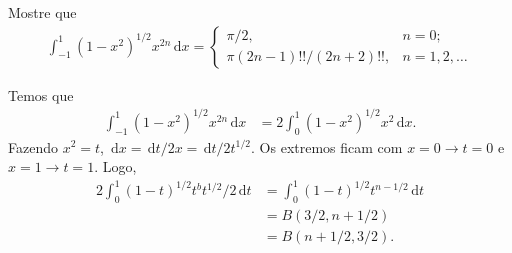 \documentclass[a4paper,12pt, leqno, answers]{exam}
\begin{document}
\begin{questions}

    \question[P2 de 2006] Mostre que
    \begin{align*}
        \int_{-1}^1 \left( 1 - x^2 \right)^{1/2} x^{2n} \,\mathrm{d}x = \begin{cases}
            \pi / 2, & n = 0; \\
            \pi \left( 2n - 1 \right)!! / \left( 2n + 2 \right)!!, & n = 1, 2, \ldots
        \end{cases}
    \end{align*}
    \begin{solution}
        Temos que
        \begin{align*}
            \int_{-1}^1 (1 - x^2)^{1/2} x^{2n} \,\mathrm{d}x &= 2 \int_0^1 (1 - x^2)^{1/2} x^2 \,\mathrm{d}x.
        \end{align*}
        Fazendo $x^2 = t$, $\,\mathrm{d}x = \,\mathrm{d}t/2x = \,\mathrm{d}t/2t^{1/2}$. Os extremos ficam com $x = 0 \to t = 0$ e $x = 1 \to t  = 1$. Logo,
        \begin{align*}
            2 \int_0^1 (1 - t)^{1/2} t^b t^{1/2} /2 \,\mathrm{d}t &= \int_0^1 (1 - t)^{1/2} t^{n - 1/2} \,\mathrm{d}t \\
            &= B(3/2, n + 1/2) \\
            &= B(n + 1/2, 3/2).
        \end{align*}
    \end{solution}


\end{questions}
\end{document}
